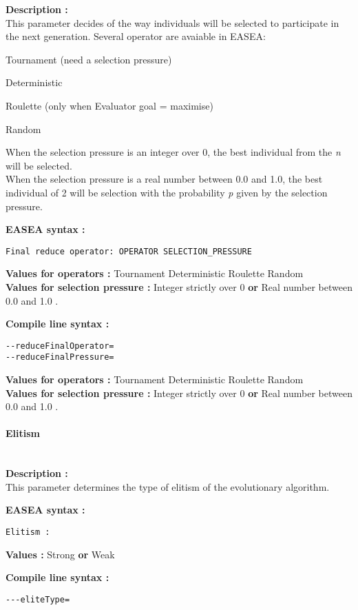 \documentclass{book}
\begin{document}
\textbf{Description :}\\This parameter decides of the way individuals
will be selected to participate in the next generation. Several operator
are avaiable in EASEA:

Tournament (need a selection pressure)

Deterministic

Roulette (only when Evaluator goal = maximise)

Random

When the selection pressure is an integer over 0, the best individual
from the \emph{n} will be selected.\\When the selection pressure is a
real number between 0.0 and 1.0, the best individual of 2 will be
selection with the probability \emph{p} given by the selection pressure.

\textbf{EASEA syntax :}

\texttt{Final~reduce~operator:~OPERATOR~SELECTION\_PRESSURE}

\textbf{Values for operators :} Tournament Deterministic Roulette
Random\\\textbf{Values for selection pressure :} Integer strictly over 0
\textbf{or} Real number between 0.0 and 1.0 .

\textbf{Compile line syntax :}

\texttt{-{}-reduceFinalOperator=}\\\texttt{-{}-reduceFinalPressure=}

\textbf{Values for operators :} Tournament Deterministic Roulette
Random\\\textbf{Values for selection pressure :} Integer strictly over 0
\textbf{or} Real number between 0.0 and 1.0 .

\paragraph{Elitism}\label{elitism}
~\\

\textbf{Description :}\\This parameter determines the type of elitism of
the evolutionary algorithm.

\textbf{EASEA syntax :}

\texttt{Elitism~:}

\textbf{Values :} Strong \textbf{or} Weak

\textbf{Compile line syntax :}

\texttt{-{}-{}-eliteType=}
\end{document}
